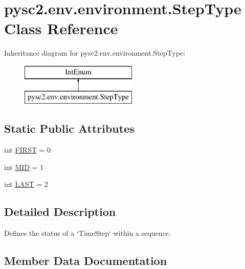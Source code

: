 \hypertarget{classpysc2_1_1env_1_1environment_1_1_step_type}{}\section{pysc2.\+env.\+environment.\+Step\+Type Class Reference}
\label{classpysc2_1_1env_1_1environment_1_1_step_type}
Inheritance diagram for pysc2.\+env.\+environment.\+Step\+Type\+:\begin{figure}[H]
\begin{center}
\leavevmode
\includegraphics[height=2.000000cm]{classpysc2_1_1env_1_1environment_1_1_step_type}
\end{center}
\end{figure}
\subsection*{Static Public Attributes}
\begin{DoxyCompactItemize}
\item 
int \mbox{\hyperlink{classpysc2_1_1env_1_1environment_1_1_step_type_a397b3b1f59357b464448f3710d3005b8}{F\+I\+R\+ST}} = 0
\item 
int \mbox{\hyperlink{classpysc2_1_1env_1_1environment_1_1_step_type_a04325a4421dd806cde9b98ba7e6b3cab}{M\+ID}} = 1
\item 
int \mbox{\hyperlink{classpysc2_1_1env_1_1environment_1_1_step_type_af5c10775f021283b4365dcf60f469699}{L\+A\+ST}} = 2
\end{DoxyCompactItemize}


\subsection{Detailed Description}
\begin{DoxyVerb}Defines the status of a `TimeStep` within a sequence.\end{DoxyVerb}
 

\subsection{Member Data Documentation}
\mbox{\label{classpysc2_1_1env_1_1environment_1_1_step_type_a397b3b1f59357b464448f3710d3005b8}} 
